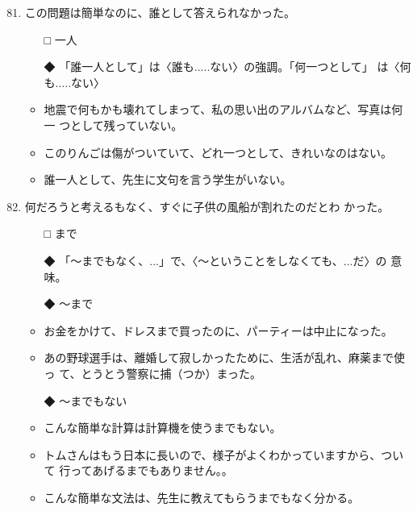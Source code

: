 \documentclass[
uplatex,
b5paper,
10pt,
dvipdfmx
]{jsbook}
\begin{document}
\begin{enumerate}
\setcounter{enumi}{80}

\item この問題は簡単なのに、誰\underline{\hspace{3zw}}として答えられなかった。

\begin{itemize}
\item[□] 一人
\item[◆] 「誰一人として」は〈誰も.....ない〉の強調。「何一つとして」
	  は〈何も.....ない〉
\end{itemize}
\begin{itemize}
\item 地震で何もかも壊れてしまって、私の思い出のアルバムなど、写真は何一
      つとして残っていない。
\item このりんごは傷がついていて、どれ一つとして、きれいなのはない。
\item 誰一人として、先生に文句を言う学生がいない。
\end{itemize}

\item 何だろうと考える\underline{\hspace{3zw}}もなく、すぐに子供の風船が割れたのだとわ
      かった。

\begin{itemize}
\item[□] まで
\item[◆] 「〜までもなく、...」で、〈〜ということをしなくても、...だ〉の
	  意味。
\end{itemize}
\begin{itemize}
\item[◆] 〜まで
\end{itemize}
\begin{itemize}
\item お金をかけて、ドレスまで買ったのに、パーティーは中止になった。
\item あの野球選手は、離婚して寂しかったために、生活が乱れ、麻薬まで使っ
      て、とうとう警察に捕（つか）まった。
\end{itemize}
\begin{itemize}
\item[◆] 〜までもない
\end{itemize}
\begin{itemize}
\item こんな簡単な計算は計算機を使うまでもない。
\item トムさんはもう日本に長いので、様子がよくわかっていますから、ついて
      行ってあげるまでもありません。。
\item こんな簡単な文法は、先生に教えてもらうまでもなく分かる。
\end{itemize}


\end{enumerate}
\end{document}
